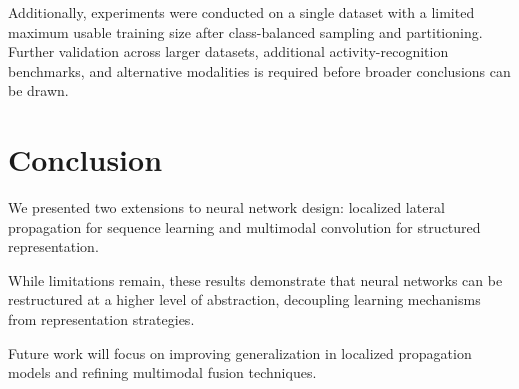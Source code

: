 \documentclass[lineno]{wlpeerj}
\begin{document}
Additionally, experiments were conducted on a single dataset with a limited maximum usable training size after class-balanced sampling and partitioning. Further validation across larger datasets, additional activity-recognition benchmarks, and alternative modalities is required before broader conclusions can be drawn.
	\section{Conclusion}
	
	We presented two extensions to neural network design: localized lateral propagation for sequence learning and multimodal convolution for structured representation.
	
	While limitations remain, these results demonstrate that neural networks can be restructured at a higher level of abstraction, decoupling learning mechanisms from representation strategies.
	
	Future work will focus on improving generalization in localized propagation models and refining multimodal fusion techniques.
	
	
	
\end{document}
